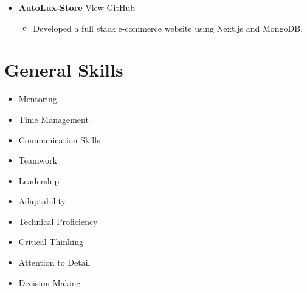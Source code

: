 \documentclass[%
               doublesided,
               paper=a4,
               fontsize=10pt
              ]{my-resume}
\begin{document}
{\begin{itemize}
      \item \textbf{AutoLux-Store} \hfill \href{https://github.com/alvin-dennis/AutoLux}{View GitHub}
   \begin{itemize}
      \item Developed a full stack e-commerce website using Next.js and MongoDB.
   \end{itemize}
   \end{itemize}

    \section{General Skills}
    \begin{multicols}{2}
    \raggedright
    \begin{itemize}[noitemsep]
        \item Mentoring
        \item Time Management
        \item Communication Skills
        \item Teamwork
        \item Leadership
        \item Adaptability
        \item Technical Proficiency
        \item Critical Thinking
        \item Attention to Detail
        \item Decision Making
    \end{itemize}
    \end{multicols}   

}
\makebody
\clearpage
\end{document}
